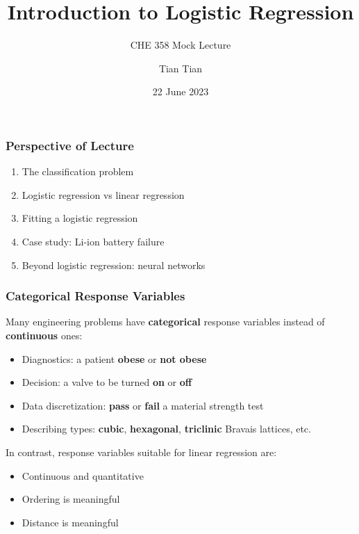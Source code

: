 \documentclass[10pt,aspectratio=169]{beamer}
\title{\Large \bfseries Introduction to Logistic Regression}
\subtitle{CHE 358 Mock Lecture}
\author{Tian Tian}
\date{22 June 2023}
\begin{document}
    
\frame{\titlepage}


\begin{frame}
\frametitle{Perspective of Lecture}
\begin{enumerate}
\item The classification problem
\item Logistic regression vs linear regression
\item Fitting a logistic regression
\item Case study: Li-ion battery failure
\item Beyond logistic regression: neural networks
\end{enumerate}
\end{frame}

\begin{frame}
  \frametitle{Categorical Response Variables}

  Many engineering problems
  have \textbf{categorical} response variables instead of
  \textbf{continuous} ones:

  \begin{itemize}
    \item Diagnostics: 	a patient \textbf{obese} or \textbf{not obese}
\item Decision:      	a valve to be turned \textbf{on} or \textbf{off}
\item Data discretization:  \textbf{pass} or \textbf{fail} a material strength test
\item Describing types: \textbf{cubic}, \textbf{hexagonal},
  \textbf{triclinic} Bravais lattices, etc.

\end{itemize}

\vspace{2em}

In contrast, response variables suitable for linear regression are:
\begin{itemize}
\item Continuous and quantitative
\item Ordering is meaningful
\item Distance is meaningful
\end{itemize}


\end{frame}
\end{document}
